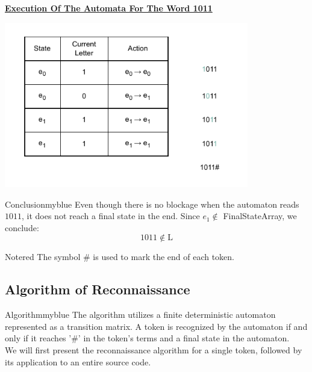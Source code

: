 \vspace{0.4cm}
\textbf{\underline{Execution Of The Automata For The Word 1011}}\\[0.25cm]

\begin{center}
    \includegraphics[width=0.8\textwidth]{Chapters/Examples/Lexi/ex1.1.drawio.pdf}
\end{center}

\newpage
\null

\begin{prettyBox}{Conclusion}{myblue}
Even though there is no blockage when the automaton reads \(1011\),  
it does not reach a final state in the end. Since \( e_1 \notin \) FinalStateArray, we conclude:  
\[ \boxed{1011 \notin \text{L}} \]
\end{prettyBox}

\vspace{0.5cm}

\begin{prettyBox}{Note}{red}
The symbol \# is used to mark the end of each token.
\end{prettyBox}

\vspace{0.5cm}

\subsection{Algorithm of Reconnaissance}
\begin{prettyBox}{Algorithm}{myblue}
The algorithm utilizes a finite deterministic automaton represented as a 
transition matrix. A token is recognized by the automaton if and only if 
it reaches '\#' in the token's terms and a final state in the automaton.\\[0.15cm]
We will first present the reconnaissance algorithm for a single token, followed by its application to an entire source code.
\end{prettyBox}

